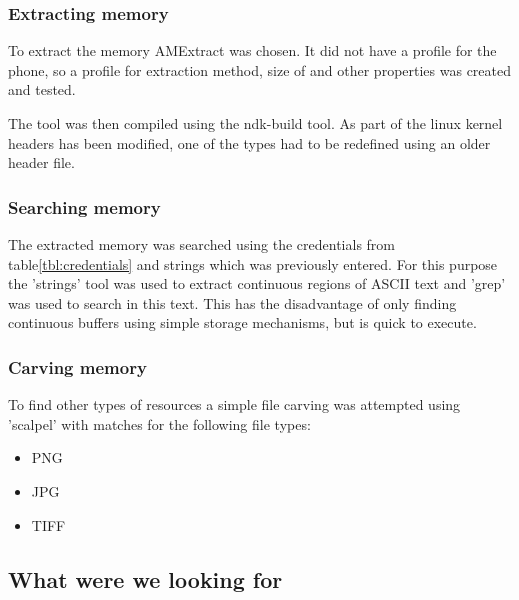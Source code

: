 


\subsubsection{Extracting memory}
To extract the memory AMExtract was chosen. %
 It did not have a profile for the phone, so a profile for extraction method, size of %
 and other properties was created and tested.
 
 The tool was then compiled using the ndk-build tool. As part of the linux kernel headers has been modified, one of the types had to be redefined using an older header file.

\subsubsection{Searching memory}
The extracted memory was searched using the credentials from table\ref{tbl:credentials} and strings which was previously entered. For this purpose the 'strings' tool was used to extract continuous regions of ASCII text and 'grep' was used to search in this text. This has the disadvantage of only finding continuous buffers using simple storage mechanisms, but is quick to execute.

\subsubsection{Carving memory}
To find other types of resources a simple file carving was attempted using 'scalpel' with matches for the following file types:
\begin{itemize}
	\item PNG
	\item JPG
	\item TIFF
\end{itemize}

\subsection{What were we looking for}
\lipsum[7]
